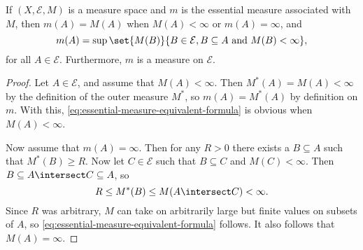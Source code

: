 \documentclass[article, a4paper, 11pt, oneside]{memoir}
\numberwithin{equation}{chapter}
\newcommand{\calE}{\mathcal{E}}
\begin{document}
\begin{lemma}
    \label{thm:essential-measure-equivalent-formula}
    If $(X,\calE,M)$ is a measure space and $m$ is the essential measure associated with $M$, then $m(A) = M(A)$ when $M(A) < \infty$ or $m(A) = \infty$, and
    \begin{equation}
        \label{eq:essential-measure-equivalent-formula}
        m(A)
            = \sup \set{ M(B) }{ B \in \calE, B \subseteq A \text{ and } M(B) < \infty },
    \end{equation}
    for all $A \in \calE$. Furthermore, $m$ is a measure on $\calE$.
\end{lemma}

\begin{proof}
    Let $A \in \calE$, and assume that $M(A) < \infty$. Then $M^*(A) = M(A) < \infty$ by the definition of the outer measure $M^*$, so $m(A) = M^*(A)$ by definition on $m$. With this, \eqref{eq:essential-measure-equivalent-formula} is obvious when $M(A) < \infty$.

    Now assume that $m(A) = \infty$. Then for any $R > 0$ there exists a $B \subseteq A$ such that $M^*(B) \geq R$. Now let $C \in \calE$ such that $B \subseteq C$ and $M(C) < \infty$. Then $B \subseteq A \intersect C \subseteq A$, so
    \begin{equation*}
        R
            \leq M^*(B)
            \leq M(A \intersect C)
            < \infty.
    \end{equation*}
    Since $R$ was arbitrary, $M$ can take on arbitrarily large but finite values on subsets of $A$, so \eqref{eq:essential-measure-equivalent-formula} follows. It also follows that $M(A) = \infty$.


\end{proof}
\end{document}
